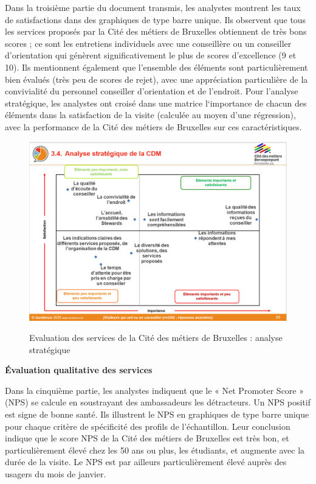 \documentclass[french,a4paper,12pt]{article}
\begin{document}
\quad Dans la troisième partie du document transmis, les analystes montrent les taux de satisfactions dans des graphiques de type barre unique. Ils observent que tous les services proposés par la Cité des métiers de Bruxelles obtiennent de très bons scores ; ce sont les entretiens individuels avec une conseillère ou un conseiller d’orientation qui génèrent significativement le plus de scores d’excellence (9 et 10). Ils mentionnent également que l’ensemble des éléments sont particulièrement bien évalués (très peu de scores de rejet), avec une appréciation particulière de la convivialité du personnel conseiller d’orientation et de l’endroit.
Pour l’analyse stratégique, les analystes ont croisé dans une matrice l‘importance de chacun des éléments dans la satisfaction de la visite (calculée au moyen d’une régression), avec la performance de la Cité des métiers de Bruxelles sur ces caractéristiques. 

\begin{center}
\begin{figure}
\includegraphics[scale=0.5]{9-cdm-analyse.PNG}
\end{figure}
\begin{figure}[h]
\caption{Evaluation des services de la Cité des métiers de Bruxelles : analyse stratégique}
\end{figure}
\end{center}

\textbf{Évaluation qualitative des services}

\quad Dans la cinquième partie, les analystes indiquent que le « Net Promoter Score » (NPS) se calcule en soustrayant des ambassadeurs les détracteurs. Un NPS positif est signe de bonne santé. Ils illustrent le NPS en graphiques de type barre unique pour chaque critère de spécificité des profils de l’échantillon. Leur conclusion indique que le score NPS de la Cité des métiers de Bruxelles est très bon, et particulièrement élevé chez les 50 ans ou plus, les étudiants, et augmente avec la durée de la visite. Le NPS est par ailleurs particulièrement élevé auprès des usagers du mois de janvier.
\end{document}
